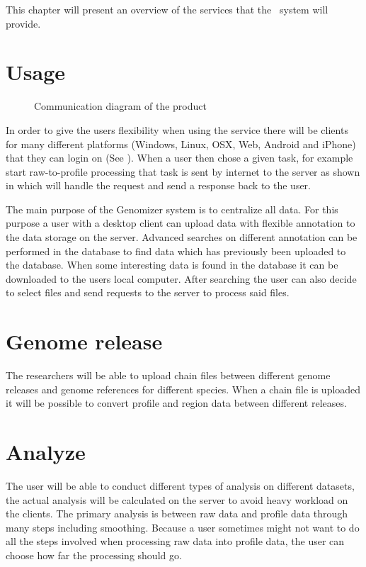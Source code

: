 


This chapter will present an overview of the services that the \appName\ system will provide. 

\section{Usage}



\begin{figure}[h]
\caption{Communication diagram of the product}
\label{con_serviceDescription}
\end{figure}
	
In order to give the users flexibility when using the service there will be clients for many different platforms (Windows, Linux, OSX, Web, Android and iPhone) that they can login on (See ). 
When a user then chose a given task, for example start raw-to-profile processing that task is sent by internet to the server as shown in  which will handle the request and send a response back to the user.

The main purpose of the Genomizer system is to centralize all data. For this purpose a user with a desktop client can upload data with flexible annotation to the data storage on the server. 
Advanced searches on different annotation can be performed in the database to find data which has previously been uploaded to the database. When some interesting data is found in the database it can be downloaded to the users local computer. 
After searching the user can also decide to select files and send requests to the server to process said files.


\section{Genome release}
The researchers will be able to upload chain files between different genome releases and genome references for different species. When a chain file is uploaded it will be possible to convert profile and region data between different releases. 

\section{Analyze}
The user will be able to conduct different types of analysis on different datasets, the actual analysis will be calculated on the server to avoid heavy workload on the clients. The primary analysis is between raw data and profile data through many steps including smoothing. Because a user sometimes might not want to do all the steps involved when processing raw data into profile data, the user can choose how far the processing should go.

